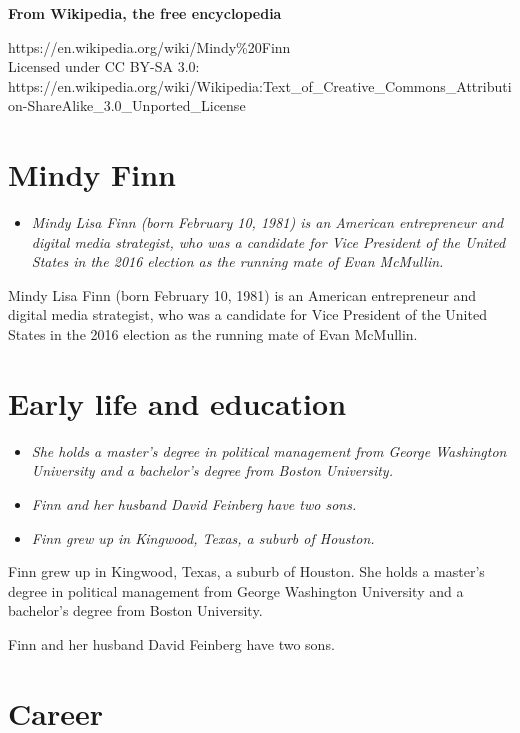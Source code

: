 \textbf{From Wikipedia, the free encyclopedia}

https://en.wikipedia.org/wiki/Mindy\%20Finn\\
Licensed under CC BY-SA 3.0:\\
https://en.wikipedia.org/wiki/Wikipedia:Text\_of\_Creative\_Commons\_Attribution-ShareAlike\_3.0\_Unported\_License

\section{Mindy Finn}\label{mindy-finn}

\begin{itemize}
\item
  \emph{Mindy Lisa Finn (born February 10, 1981) is an American
  entrepreneur and digital media strategist, who was a candidate for
  Vice President of the United States in the 2016 election as the
  running mate of Evan McMullin.}
\end{itemize}

Mindy Lisa Finn (born February 10, 1981) is an American entrepreneur and
digital media strategist, who was a candidate for Vice President of the
United States in the 2016 election as the running mate of Evan McMullin.

\section{Early life and education}\label{early-life-and-education}

\begin{itemize}
\item
  \emph{She holds a master's degree in political management from George
  Washington University and a bachelor's degree from Boston University.}
\item
  \emph{Finn and her husband David Feinberg have two sons.}
\item
  \emph{Finn grew up in Kingwood, Texas, a suburb of Houston.}
\end{itemize}

Finn grew up in Kingwood, Texas, a suburb of Houston. She holds a
master's degree in political management from George Washington
University and a bachelor's degree from Boston University.

Finn and her husband David Feinberg have two sons.

\section{Career}\label{career}

